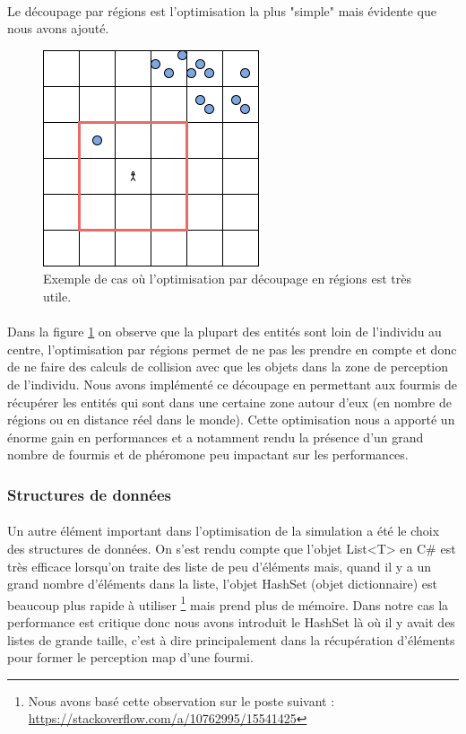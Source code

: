 \documentclass{EPUProjetDi}
\begin{document}
\paragraph{}
Le découpage par régions est l'optimisation la plus "simple" mais évidente que nous avons ajouté.

\begin{figure}[h]
    \centering
    \includegraphics[scale=1]{decoupage_region.png}
    \caption{Exemple de cas où l'optimisation par découpage en régions est très utile.}
    \label{fig:decoupage_region}
\end{figure}

\paragraph{}
Dans la figure \ref{fig:decoupage_region} on observe que la plupart des entités sont loin de l'individu au centre, l'optimisation par régions permet de ne pas les prendre en compte et donc de ne faire des calculs
de collision avec que les objets dans la zone de perception de l'individu.
Nous avons implémenté ce découpage en permettant aux fourmis de récupérer les entités qui sont dans une certaine zone autour d'eux (en nombre de régions ou en distance réel dans le monde).
Cette optimisation nous a apporté un énorme gain en performances et a notamment rendu la présence d'un grand nombre de fourmis et de phéromone peu impactant sur les performances.

\subsubsection{Structures de données}
\paragraph{}
Un autre élément important dans l'optimisation de la simulation a été le choix des structures de données. 
On s'est rendu compte que l'objet List<T> en C\# est très efficace lorsqu'on traite des liste de peu d'éléments
mais, quand il y a un grand nombre d'éléments dans la liste, l'objet HashSet (objet dictionnaire) est beaucoup plus rapide à utiliser
\footnote{Nous avons basé cette observation sur le poste suivant : \url{https://stackoverflow.com/a/10762995/15541425}} mais prend plus de mémoire.
Dans notre cas la performance est critique donc nous avons introduit le HashSet là où il y avait des listes de grande taille, 
c'est à dire principalement dans la récupération d'éléments pour former le perception map d'une fourmi.
\end{document}
